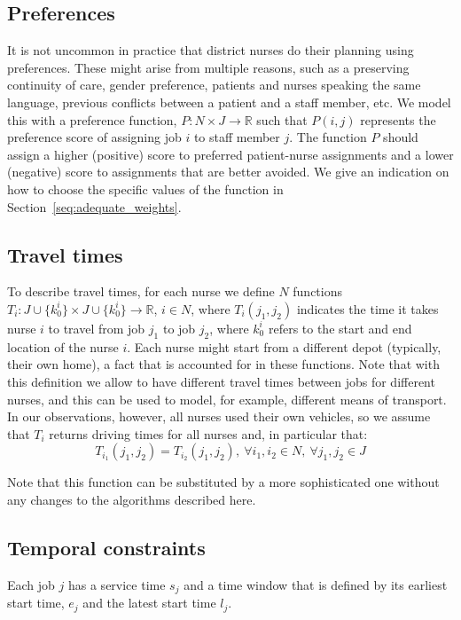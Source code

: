 \documentclass[a4paper,11pt]{elsarticle}
\begin{document}
\subsection{Preferences}
It is not uncommon in practice that district nurses do their planning using preferences. These might arise from multiple reasons, such as a preserving continuity of care, gender preference, patients and nurses speaking the same language, previous conflicts between a patient and a staff member, etc. We model this with a preference function, $P: N\times J \rightarrow \mathbb{R}$ such that $P(i,j)$ represents the preference score of assigning job $i$ to staff member $j$. The function $P$ should assign a higher (positive) score to preferred patient-nurse assignments and a lower (negative) score to assignments that are better avoided. We give an indication on how to choose the specific values of the function in Section~\ref{seq:adequate_weights}.


\subsection{Travel times}
To describe travel times, for each nurse we define $N$ functions $T_i: J\cup\{k^i_0\} \times J\cup\{k^i_0\} \rightarrow \mathbb{R}$, $i \in N$, where $T_i(j_1, j_2)$ indicates the time it takes nurse $i$ to travel from job $j_1$ to job $j_2$, where $k^i_0$ refers to the start and end location of the nurse $i$. Each nurse might start from a different depot (typically, their own home), a fact that is accounted for in these functions. Note that with this definition we allow to have different travel times between jobs for different nurses, and this can be used to model, for example, different means of transport. In our observations, however, all nurses used their own vehicles, so we assume that $T_i$ returns driving times for all nurses and, in particular that:
\begin{equation}
    T_{i_1}(j_1, j_2) = T_{i_2}(j_1, j_2),\ \forall i_1, i_2 \in N,\ \forall j_1, j_2 \in J
\end{equation} 

Note that this function can be substituted by a more sophisticated one without any changes to the algorithms described here.



\subsection{Temporal constraints}\label{seq:sub temporal constraints}
Each job $j$ has a service time $s_j$ and a time window that is defined by its earliest start time, $e_j$ and the latest start time $l_j$.
\end{document}
